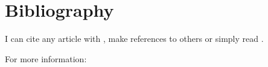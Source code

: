 \documentclass[12pt]{article}
\begin{document}

\section{Bibliography}

I can cite any article with \citet{thekey}, make references to others \citep{Lander2016} 
or simply read \cite{HP3}.



%


For more information: 
\end{document}
